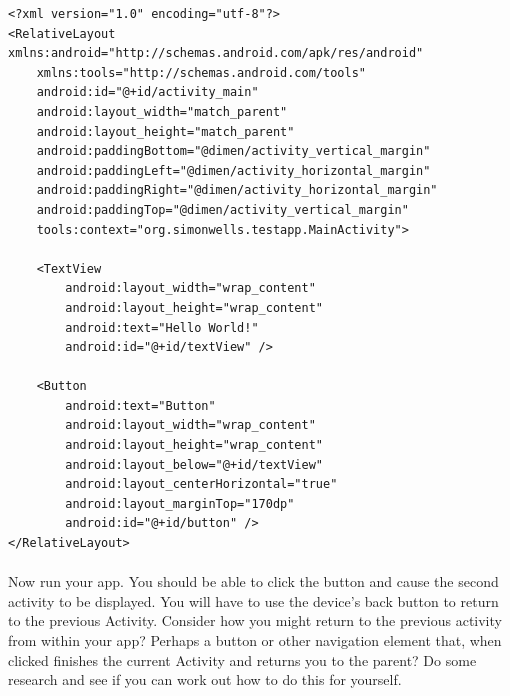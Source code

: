 \begin{lstlisting}
<?xml version="1.0" encoding="utf-8"?>
<RelativeLayout xmlns:android="http://schemas.android.com/apk/res/android"
    xmlns:tools="http://schemas.android.com/tools"
    android:id="@+id/activity_main"
    android:layout_width="match_parent"
    android:layout_height="match_parent"
    android:paddingBottom="@dimen/activity_vertical_margin"
    android:paddingLeft="@dimen/activity_horizontal_margin"
    android:paddingRight="@dimen/activity_horizontal_margin"
    android:paddingTop="@dimen/activity_vertical_margin"
    tools:context="org.simonwells.testapp.MainActivity">

    <TextView
        android:layout_width="wrap_content"
        android:layout_height="wrap_content"
        android:text="Hello World!"
        android:id="@+id/textView" />

    <Button
        android:text="Button"
        android:layout_width="wrap_content"
        android:layout_height="wrap_content"
        android:layout_below="@+id/textView"
        android:layout_centerHorizontal="true"
        android:layout_marginTop="170dp"
        android:id="@+id/button" />
</RelativeLayout>

\end{lstlisting}

\paragraph{} Now run your app. You should be able to click the button and cause the second activity to be displayed. You will have to use the device's back button to return to the previous Activity. Consider how you might return to the previous activity from within your app? Perhaps a button or other navigation element that, when clicked finishes the current Activity and returns you to the parent? Do some research and see if you can work out how to do this for yourself.

